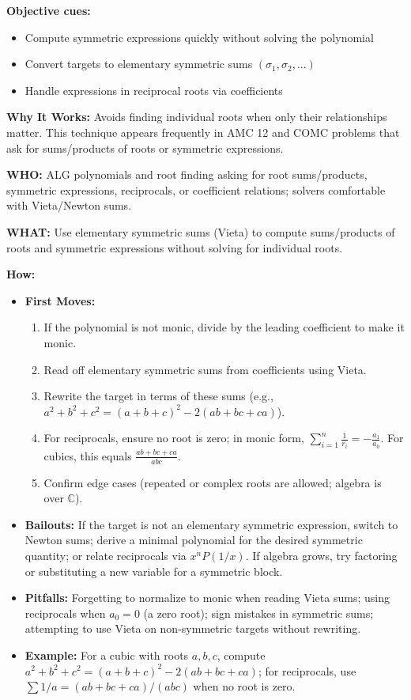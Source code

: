 \documentclass[12pt]{article}
\begin{document}
\textbf{Objective cues:}
\begin{itemize}
    \item Compute symmetric expressions quickly without solving the polynomial
    \item Convert targets to elementary symmetric sums \((\sigma_1,\sigma_2,\dots)\)
    \item Handle expressions in reciprocal roots via coefficients
\end{itemize}

\textbf{Why It Works:} Avoids finding individual roots when only their relationships matter. This technique appears frequently in AMC 12 and COMC problems that ask for sums/products of roots or symmetric expressions.

\textbf{WHO:} ALG polynomials and root finding asking for root sums/products, symmetric expressions, reciprocals, or coefficient relations; solvers comfortable with Vieta/Newton sums.

\textbf{WHAT:} Use elementary symmetric sums (Vieta) to compute sums/products of roots and symmetric expressions without solving for individual roots.


\textbf{How:}
\begin{itemize}
    \item \textbf{First Moves:}
    \begin{enumerate}[nosep]
        \item If the polynomial is not monic, divide by the leading coefficient to make it monic.
        \item Read off elementary symmetric sums from coefficients using Vieta.
        \item Rewrite the target in terms of these sums (e.g., \(a^2+b^2+c^2=(a+b+c)^2-2(ab+bc+ca)\)).
        \item For reciprocals, ensure no root is zero; in monic form, \(\sum_{i=1}^n \tfrac{1}{r_i} = -\tfrac{a_1}{a_0}\). For cubics, this equals \(\tfrac{ab+bc+ca}{abc}\).
        \item Confirm edge cases (repeated or complex roots are allowed; algebra is over \(\mathbb{C}\)).
    \end{enumerate}
    \item \textbf{Bailouts:} If the target is not an elementary symmetric expression, switch to Newton sums; derive a minimal polynomial for the desired symmetric quantity; or relate reciprocals via \(x^n P(1/x)\). If algebra grows, try factoring or substituting a new variable for a symmetric block.
    \item \textbf{Pitfalls:} Forgetting to normalize to monic when reading Vieta sums; using reciprocals when \(a_0=0\) (a zero root); sign mistakes in symmetric sums; attempting to use Vieta on non-symmetric targets without rewriting.
    \item \textbf{Example:} For a cubic with roots \(a,b,c\), compute \(a^2+b^2+c^2=(a+b+c)^2-2(ab+bc+ca)\); for reciprocals, use \(\sum 1/a = (ab+bc+ca)/(abc)\) when no root is zero.
\end{itemize}
\end{document}
